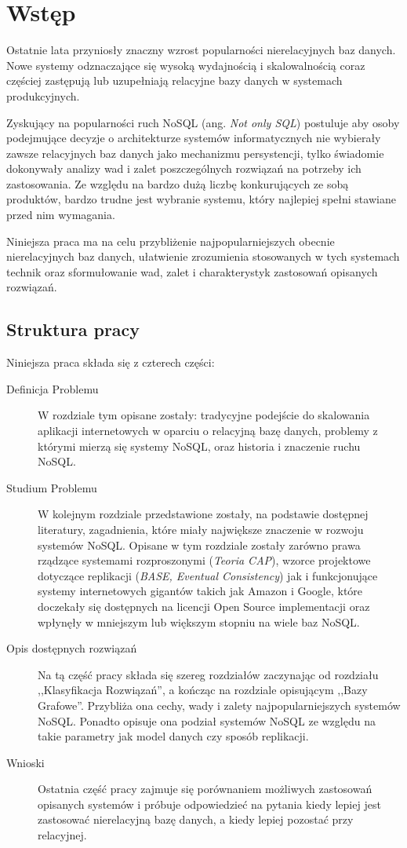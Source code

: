 \chapter{Wstęp}

Ostatnie lata przyniosły znaczny wzrost popularności nierelacyjnych baz danych.
Nowe systemy odznaczające się wysoką wydajnością i skalowalnością coraz częściej zastępują lub uzupełniają relacyjne bazy danych w systemach produkcyjnych.

Zyskujący na popularności ruch NoSQL (ang. \emph{Not only SQL}) postuluje aby osoby podejmujące decyzje o architekturze systemów informatycznych nie wybierały zawsze relacyjnych baz danych jako mechanizmu persystencji, tylko świadomie dokonywały analizy wad i zalet poszczególnych rozwiązań na potrzeby ich zastosowania.
Ze względu na bardzo dużą liczbę konkurujących ze sobą produktów, bardzo trudne jest wybranie systemu, który najlepiej spełni stawiane przed nim wymagania.

Niniejsza praca ma na celu przybliżenie najpopularniejszych obecnie nierelacyjnych baz danych, ułatwienie zrozumienia stosowanych w tych systemach technik oraz sformułowanie wad, zalet i charakterystyk zastosowań opisanych rozwiązań.

\section{Struktura pracy}

Niniejsza praca składa się z czterech części:

\begin{description}
 \item[Definicja Problemu]
 W rozdziale tym opisane zostały: tradycyjne podejście do skalowania aplikacji internetowych w oparciu o relacyjną bazę danych, problemy z którymi mierzą się systemy NoSQL, oraz historia i znaczenie ruchu NoSQL.
 \item[Studium Problemu]
 W kolejnym rozdziale przedstawione zostały, na podstawie dostępnej literatury, zagadnienia, które miały największe znaczenie w rozwoju systemów NoSQL.
 Opisane w tym rozdziale zostały zarówno prawa rządzące systemami rozproszonymi (\emph{Teoria CAP}), wzorce projektowe dotyczące replikacji (\emph{BASE, Eventual Consistency}) jak i funkcjonujące systemy internetowych gigantów takich jak Amazon i Google, które doczekały się dostępnych na licencji Open Source implementacji oraz wpłynęły w mniejszym lub większym stopniu na wiele baz NoSQL.
 \item[Opis dostępnych rozwiązań]
 Na tą część pracy składa się szereg rozdziałów zaczynając od rozdziału ,,Klasyfikacja Rozwiązań'', a kończąc na rozdziale opisującym ,,Bazy Grafowe''.
 Przybliża ona cechy, wady i zalety najpopularniejszych systemów NoSQL.
 Ponadto opisuje ona podział systemów NoSQL ze względu na takie parametry jak model danych czy sposób replikacji.
 \item[Wnioski]
 Ostatnia część pracy zajmuje się porównaniem możliwych zastosowań opisanych systemów i próbuje odpowiedzieć na pytania kiedy lepiej jest zastosować nierelacyjną bazę danych, a kiedy lepiej pozostać przy relacyjnej.
\end{description}

